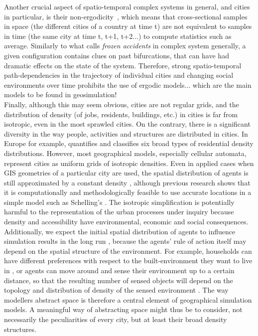 \documentclass[3p,times,procedia]{elsarticle}
\begin{document}
Another crucial aspect of spatio-temporal complex systems in general, and cities in particular, is their non-ergodicity~\citep{pumain2012urban}, which means that cross-sectional samples in space (the different cities of a country at time t) are not equivalent to samples in time (the same city at time t, t+1, t+2...) to compute statistics such as average. Similarly to what \citet{gell1995quark} calls \emph{frozen accidents} in complex system generally, a given configuration contains clues on past bifurcations, that can have had dramatic effects on the state of the system. Therefore, strong spatio-temporal path-dependencies in the trajectory of individual cities and changing social environments over time prohibits the use of ergodic models... which are the main models to be found in geosimulation! \\

Finally, although this may seem obvious, cities are not regular grids, and the distribution of density (of jobs, residents, buildings, etc.) in cities is far from isotropic, even in the most sprawled cities. On the contrary, there is a significant diversity in the way people, activities and structures are distributed in cities. In Europe for example, \citet{LeNechet2015} quantifies and classifies six broad types of residential density distributions. However, most geographical models, especially cellular automata, represent cities as uniform grids of isotropic densities. Even in applied cases when GIS geometries of a particular city are used, the spatial distribution of agents is still approximated by a constant density \citep{arribas2014diverse}, although previous research shows that it is computationally and methodologically feasible to use accurate locations in a simple model such as Schelling's \citep{benenson2002entity}. The isotropic simplification is potentially harmful to the representation of the urban processes under inquiry because density and accessibility have environmental, economic and social consequences. Additionally, we expect the initial spatial distribution of agents to influence simulation results in the long run \citep{Castellanoetal2009}, because the agents' rule of action itself may depend on the spatial structure of the environment. For example, households can have different preferences with respect to the built-environment they want to live in \citep{SpielmanHarrison2014}, or agents can move around and sense their environment up to a certain distance, so that the resulting number of sensed objects will depend on the topology \citep{Banos2012} and distribution of density of the sensed environment \citep{LauriJaggi2003, FossettDietrich2009}. The way modellers abstract space is therefore a central element of geographical simulation models. A meaningful way of abstracting space might thus be to consider, not necessarily the peculiarities of every city, but at least their broad density structures.
\end{document}
